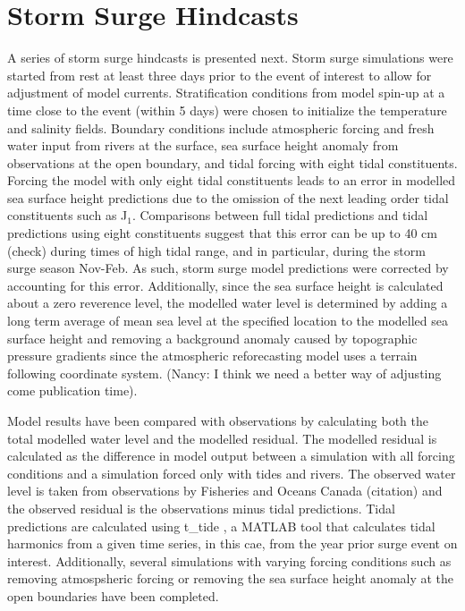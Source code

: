 \documentclass[pdftex,10pt]{article}
\begin{document}
\section{Storm Surge Hindcasts}\label{sec:storm}
A series of storm surge hindcasts is presented next. Storm surge simulations were started from rest at least three days prior to the event of interest to allow for adjustment of model currents. Stratification conditions from model spin-up at a time close to the event (within 5 days) were chosen to initialize the temperature and salinity fields. Boundary conditions include atmospheric forcing and fresh water input from rivers at the surface, sea surface height anomaly from observations at the open boundary, and tidal forcing with eight tidal constituents. Forcing the model with only eight tidal constituents leads to an error in modelled sea surface height predictions due to the omission of the next leading order tidal constituents such as J$_1$. Comparisons between full tidal predictions and tidal predictions using eight constituents suggest that this error can be up to 40 cm (check) during times of high tidal range, and in particular, during the storm surge season Nov-Feb. As such, storm surge model predictions were corrected by accounting for this error. Additionally, since the sea surface height is calculated about a zero reverence level, the modelled water level is determined by adding a long term average of mean sea level at the specified location to the modelled sea surface height and removing a background anomaly caused by topographic pressure gradients since the atmospheric reforecasting model uses a terrain following coordinate system. (Nancy: I think we need a better way of adjusting come publication time).

Model results have been compared with observations by calculating both the total modelled water level and the modelled residual. The modelled residual is calculated as the difference in model output between a simulation with all forcing conditions and a simulation forced only with tides and rivers. The observed water level is taken from observations by Fisheries and Oceans Canada (citation) and the observed residual is the observations minus tidal predictions. Tidal predictions are calculated using t\_tide \citep{pawlowicz2002classical}, a MATLAB tool that calculates tidal harmonics from a given time series, in this cae, from the year prior surge event on interest. Additionally, several simulations with varying forcing conditions such as removing atmospsheric forcing or removing the sea surface height anomaly at the open boundaries have been completed. 
\end{document}
